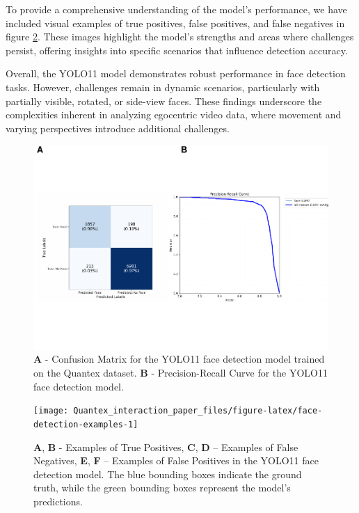 \documentclass[
  man,floatsintext]{apa6}
\begin{document}
To provide a comprehensive understanding of the model's performance, we have included visual examples of true positives, false positives, and false negatives in figure \ref{fig:face-detection-examples}. These images highlight the model's strengths and areas where challenges persist, offering insights into specific scenarios that influence detection accuracy.

Overall, the YOLO11 model demonstrates robust performance in face detection tasks. However, challenges remain in dynamic scenarios, particularly with partially visible, rotated, or side-view faces. These findings underscore the complexities inherent in analyzing egocentric video data, where movement and varying perspectives introduce additional challenges.

\begin{figure}

{\centering \includegraphics{Quantex_interaction_paper_files/figure-latex/face-metrics-1} 

}

\caption{\textbf{A} - Confusion Matrix for the YOLO11 face detection model trained on the Quantex dataset. \textbf{B} - Precision-Recall Curve for the YOLO11 face detection model.}\label{fig:face-metrics}
\end{figure}

\begin{figure}

{\centering \texttt{[image: Quantex\_interaction\_paper\_files/figure-latex/face-detection-examples-1]} 

}

\caption{\textbf{A}, \textbf{B} - Examples of True Positives, \textbf{C}, \textbf{D} – Examples of False Negatives, \textbf{E}, \textbf{F} – Examples of False Positives in the YOLO11 face detection model. The blue bounding boxes indicate the ground truth, while the green bounding boxes represent the model's predictions.}\label{fig:face-detection-examples}
\end{figure}
\end{document}
